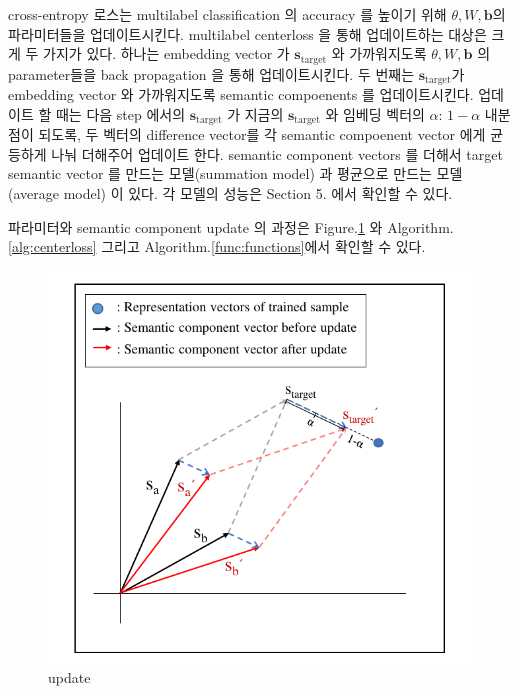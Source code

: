 cross-entropy 로스는 multilabel classification 의 accuracy 를 높이기 위해 $\theta, W, \mathbf{b}$의 파라미터들을 업데이트시킨다. multilabel centerloss 을 통해 업데이트하는 대상은 크게 두 가지가 있다. 하나는 embedding vector 가 $\mathbf{s}_{\text{target}}$ 와 가까워지도록 $\theta, W, \mathbf{b}$ 의 parameter들을 back propagation 을 통해 업데이트시킨다. 두 번째는 $\mathbf{s}_{\text{target}}$가 embedding vector 와 가까워지도록 semantic compoenents 를 업데이트시킨다. 업데이트 할 때는 다음 step 에서의  $\mathbf{s}_{\text{target}}$ 가 지금의 $\mathbf{s}_{\text{target}}$ 와 임베딩 벡터의 $\alpha$: $1-\alpha$ 내분점이 되도록, 두 벡터의 difference vector를 각 semantic compoenent vector 에게 균등하게 나눠 더해주어 업데이트 한다. 
semantic component vectors 를 더해서 target semantic vector 를 만드는 모델(summation model) 과 평균으로 만드는 모델(average model) 이 있다. 각 모델의 성능은 Section 5. 에서 확인할 수 있다. 

파라미터와 semantic component update 의 과정은 Figure.\ref{fig:update} 와 Algorithm.\ref{alg:centerloss} 그리고 Algorithm.\ref{func:functions}에서 확인할 수 있다. 



\begin{figure}[!htb] %
  \includegraphics[width=\columnwidth]{../../figures/update.pdf}
  \caption{update}
  \label{fig:update}
\end{figure}



